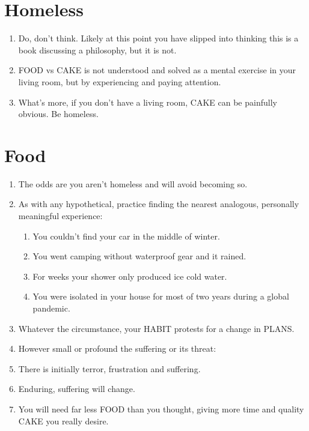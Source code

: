 \documentclass[
]{book}
\providecommand{\tightlist}{%
  \setlength{\itemsep}{0pt}\setlength{\parskip}{0pt}}
\begin{document}
\hypertarget{homeless}{%
\section{Homeless}\label{homeless}}

\begin{enumerate}
\def\labelenumi{\arabic{enumi}.}
\setcounter{enumi}{25}
\tightlist
\item
  Do, don't think. Likely at this point you have slipped into thinking this is a book discussing a philosophy, but it is not.
\item
  FOOD vs CAKE is not understood and solved as a mental exercise in your living room, but by experiencing and paying attention.
\item
  What's more, if you don't have a living room, CAKE can be painfully obvious. Be homeless.
\end{enumerate}

\hypertarget{food}{%
\section{Food}\label{food}}

\begin{enumerate}
\def\labelenumi{\arabic{enumi}.}
\setcounter{enumi}{28}
\tightlist
\item
  The odds are you aren't homeless and will avoid becoming so.
\item
  As with any hypothetical, practice finding the nearest analogous, personally meaningful experience:

  \begin{enumerate}
  \def\labelenumii{\arabic{enumii}.}
  \tightlist
  \item
    You couldn't find your car in the middle of winter.
  \item
    You went camping without waterproof gear and it rained.
  \item
    For weeks your shower only produced ice cold water.
  \item
    You were isolated in your house for most of two years during a global pandemic.
  \end{enumerate}
\item
  Whatever the circumstance, your HABIT protests for a change in PLANS.
\item
  However small or profound the suffering or its threat:
\item
  There is initially terror, frustration and suffering.
\item
  Enduring, suffering will change.
\item
  You will need far less FOOD than you thought, giving more time and quality CAKE you really desire.
\end{enumerate}
\end{document}
